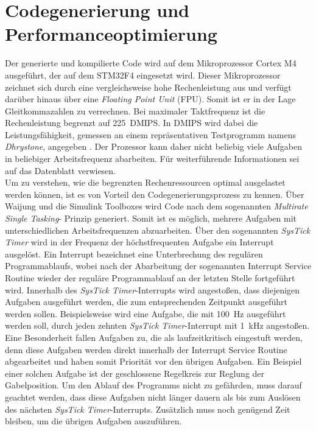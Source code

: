 \section{Codegenerierung und Performanceoptimierung} \label{performanceopt}
Der generierte und kompilierte Code wird auf dem Mikroprozessor Cortex M4 ausgeführt, der auf dem STM32F4 eingesetzt wird. Dieser Mikroprozessor zeichnet sich durch eine vergleichsweise hohe Rechenleistung aus und verfügt darüber hinaus über eine \textit{Floating Point Unit} (FPU). Somit ist er in der Lage Gleitkommazahlen zu verrechnen. Bei maximaler Taktfrequenz ist die Rechenleistung begrenzt auf \SI{225}{DMIPS}. In DMIPS wird dabei die Leistungsfähigkeit, gemessen an einem repräsentativen Testprogramm namens \textit{Dhrystone}, angegeben \cite{dmips}. Der Prozessor kann daher nicht beliebig viele Aufgaben in beliebiger Arbeitsfrequenz abarbeiten. Für weiterführende Informationen sei auf das Datenblatt \cite{stm32} verwiesen.\\
Um zu verstehen, wie die begrenzten Rechenressourcen optimal ausgelastet werden können, ist es von Vorteil den Codegenerierungsprozess zu kennen. Über Waijung und die Simulink Toolboxes wird Code nach dem sogenannten \textit{Multirate Single Tasking}- Prinzip generiert. Somit ist es möglich, mehrere Aufgaben mit unterschiedlichen Arbeitsfrequenzen abzuarbeiten.  Über den sogenannten \textit{SysTick Timer} wird in der Frequenz der höchstfrequenten Aufgabe ein Interrupt ausgelöst. Ein Interrupt bezeichnet eine Unterbrechung des regulären Programmablaufs, wobei nach der Abarbeitung der sogenannten Interrupt Service Routine wieder der reguläre Programmablauf an der letzten Stelle fortgeführt wird. 
Innerhalb des \textit{SysTick Timer}-Interrupts wird angestoßen, dass diejenigen Aufgaben ausgeführt werden, die zum entsprechenden Zeitpunkt ausgeführt werden sollen. Beispielsweise wird eine Aufgabe, die mit \SI{100}{Hz} ausgeführt werden soll, durch jeden zehnten \textit{SysTick Timer}-Interrupt mit \SI{1}{kHz} angestoßen. Eine Besonderheit fallen Aufgaben zu, die als laufzeitkritisch eingestuft werden, denn diese Aufgaben werden direkt innerhalb der Interrupt Service Routine abgearbeitet und haben somit Priorität vor den übrigen Aufgaben. Ein Beispiel einer solchen Aufgabe ist der geschlossene Regelkreis zur Reglung der Gabelposition. Um den Ablauf des Programms nicht zu gefährden, muss darauf geachtet werden, dass diese Aufgaben nicht länger dauern als bis zum Auslösen des nächsten \textit{SysTick Timer}-Interrupts. Zusätzlich muss noch genügend Zeit bleiben, um die übrigen Aufgaben auszuführen.\cite{waijung}\\
